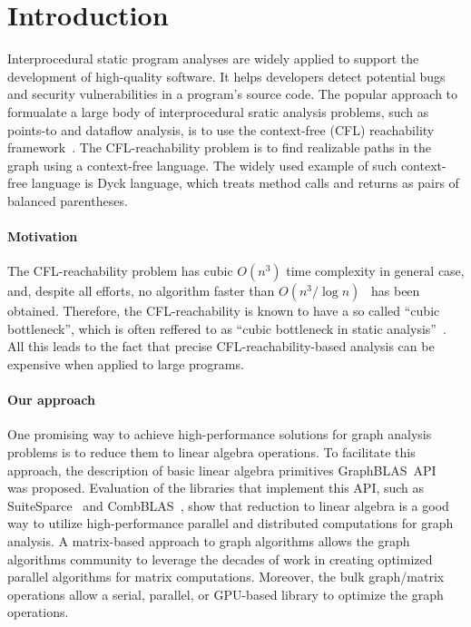 \section{Introduction}
\label{sec:intro}
Interprocedural static program analyses are widely applied to support the development of high-quality software. It helps developers detect potential bugs and security vulnerabilities in a program's source code. The popular approach to formualate a large body of interprocedural sratic analysis problems, such as points-to and dataflow analysis, is to use the context-free (CFL) reachability framework~\cite{10.5555/271338.271343}. The CFL-reachability problem is to find realizable paths in the graph using a context-free language. The widely used example of such context-free language is Dyck language, which treats method calls and returns as pairs of balanced parentheses.

\paragraph*{Motivation}
The CFL-reachability problem has cubic $O(n^3)$ time complexity in general case, and, despite all efforts, no algorithm faster than $O(n^3/\log n)$~\cite{10.1145/1328438.1328460} has been obtained. Therefore, the CFL-reachability is known to have a so called ``cubic bottleneck'', which is often reffered to as ``cubic bottleneck in static analysis''~\cite{10.5555/788019.788876}.
All this leads to the fact that precise CFL-reachability-based  analysis  can be expensive when applied to large programs. 

\paragraph*{Our approach}
One promising way to achieve high-performance solutions for graph analysis problems is to reduce them to linear algebra operations.
To facilitate this approach, the description of basic linear algebra primitives GraphBLAS~API~\cite{7761646} was proposed.
Evaluation of the libraries that implement this API, such as SuiteSparce~\cite{10.1145/3322125} and CombBLAS~\cite{10.1177/1094342011403516}, show that reduction to linear algebra is a good way to utilize high-performance parallel and distributed computations for graph analysis. A matrix-based approach to graph algorithms allows the graph algorithms community to leverage the decades of work in creating optimized parallel algorithms for matrix computations. Moreover, the bulk graph/matrix operations allow a serial, parallel, or GPU-based library to optimize the graph operations.

